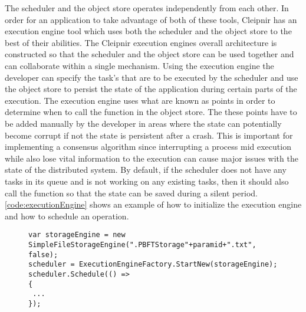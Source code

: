 The scheduler and the object store operates independently from each other. In order for an application to take advantage of both of these tools, Cleipnir has an execution engine tool which uses both the scheduler and the object store to the best of their abilities.
The Cleipnir execution engines overall architecture is constructed so that the scheduler and the object store can be used together and can collaborate within a single mechanism. Using the execution engine the developer can specify the task's that are to be executed by the scheduler and use the object store to persist the state of the application during certain parts of the execution. The execution engine uses what are known as  points in order to determine when to call the  function in the object store. The these points have to be added manually by the developer in areas where the state can potentially become corrupt if not the state is persistent after a crash. This is important for implementing a consensus algorithm since interrupting a process mid execution while also lose vital information to the execution can cause major issues with the state of the distributed system. By default, if the scheduler does not have any tasks in its queue and is not working on any existing tasks, then it should also call the  function so that the state can be saved during a silent period. \autoref{code:executionEngine} shows an example of how to initialize the execution engine and how to schedule an operation\cite[p.~11]{PAPER:PaxosCleipnir}.

\begin{figure}[H]
	\centering
	\lstset{style=sharpc}
	\begin{lstlisting}[label = code:executionEngine, caption=Execution engine example, captionpos=b, basicstyle=\scriptsize]
var storageEngine = new SimpleFileStorageEngine(".PBFTStorage"+paramid+".txt", false);
scheduler = ExecutionEngineFactory.StartNew(storageEngine);
scheduler.Schedule(() => 
{
 ...
});
	\end{lstlisting}
\end{figure}

